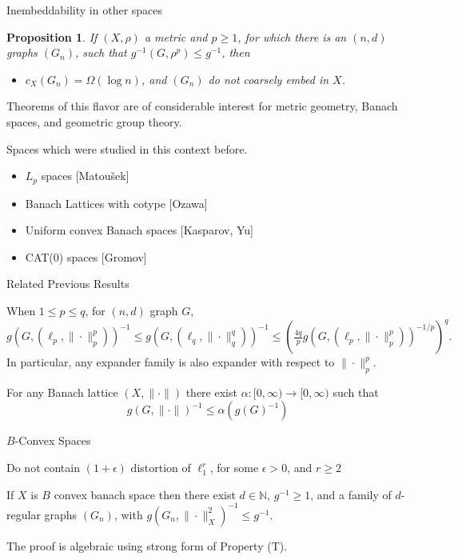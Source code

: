 \documentclass[compress]{beamer}
\newtheorem{proposition}{Proposition}
\begin{document}
\begin{frame}{Inembeddability in other spaces}

\onslide<+->
\begin{proposition}
If $(X,\rho)$ a metric and $p\ge 1$, for which there is an $(n,d)$ graphs $(G_n)$,  such that $g^{-1}(G,\rho^p)\le g^{-1}$, then 
\begin{itemize}
\item $c_X(G_n)=\Omega(\log n)$, and
$(G_n)$ do not coarsely embed in $X$.
\end{itemize}
\end{proposition}


\onslide<+->

Theorems of this flavor are  of considerable interest for metric geometry, Banach spaces, and geometric group theory.

Spaces which were studied in this context before.

\begin{itemize}
\item $L_p$ spaces [Matou\v{s}ek]
\item Banach Lattices with cotype [Ozawa]
\item Uniform convex Banach spaces [Kasparov, Yu]
\item CAT(0) spaces [Gromov]
\end{itemize}

\end{frame}


\begin{frame}{Related Previous Results}
\onslide<+->
\begin{theorem}[Matou\v{s}ek]
When $1\le p \le q$, for $(n,d)$ graph $G$,
\[ g(G,(\ell_p,\|\cdot\|_p^p))^{-1} \le g(G,(\ell_q,\|\cdot\|_q^q))^{-1} \le \left( \tfrac{4q}{p} g(G,(\ell_p,\|\cdot\|_p^p))^{-1/p} \right)^q. \]
In particular, any expander family is also expander with respect to $\|\cdot \|_p^p$.
\end{theorem}
\medskip

\onslide<+->

\begin{theorem}
For any Banach lattice $(X,\|\cdot \|)$ there exist $\alpha:[0,\infty)\to [0,\infty)$
such that
\[ g(G,\|\cdot\|)^{-1} \le \alpha(g(G)^{-1}) \]
\end{theorem}

\end{frame}

\begin{frame}{$B$-Convex Spaces}
\begin{definition}
Do not contain $(1+\epsilon)$ distortion of $\ell_1^r$, for some $\epsilon>0$, and $r\ge 2$
\end{definition}

\begin{theorem}[Lafforgue]
If $X$ is $B$ convex banach space then there exist $d\in \mathbb N$, $g^{-1}\ge 1$, and a family of $d$-regular graphs
$(G_n)$, with $g(G_n,\|\cdot\|_X^2)^{-1}\le g^{-1}$.
\end{theorem}

The proof is algebraic using strong form of Property (T).
 \end{frame}
\end{document}
